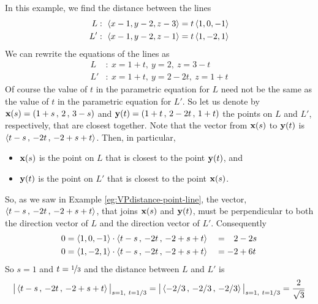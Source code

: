 \begin{eg}[Optional]\label{eg:VPdistance-line-line}
In this example, we find the distance between the lines
\begin{align*}
L&:\  \left< x-1,y-2,z-3\right> = t \left< 1,0,-1 \right> \\
L'&:\ \left< x-1,y-2,z-1\right> = t \left< 1,-2,1 \right> 
\end{align*}
We can rewrite the equations of the lines as
\begin{align*}
L&:\  x=1+t,\ y=2,\ z=3-t \\
L'&:\ x=1+t,\ y=2-2t,\ z=1+t 
\end{align*}
Of course the value of $t$ in the parametric equation for $L$ need not be 
the same as the value of $t$ in the parametric equation for $L'$. So 
let us denote by $\mathbf{x}(s) = (1+s\,,\,2\,,\,3-s)$ and 
$\mathbf{y}(t) = (1+t\,,\,2-2t\,,\,1+t)$ 
the points on $L$ and $L'$, respectively, that are closest together. 
Note that the vector from $\mathbf{x}(s)$ to $\mathbf{y}(t)$ is
$\left<  t-s\,,\,-2t\,,\,-2+s+t \right>$. Then, in particular,
\begin{itemize}\itemsep1pt \parskip0pt 
\item
$\mathbf{x}(s)$ is the point on $L$ that is closest to the point $\mathbf{y}(t)$, and
\item
$\mathbf{y}(t)$ is the point on $L'$ that is closest to the point $\mathbf{x}(s)$.
\end{itemize}
So, as we saw in Example \ref{eg:VPdistance-point-line},
the vector, $\left<  t-s\,,\,-2t\,,\,-2+s+t \right>$, that joins $\mathbf{x}(s)$ and $\mathbf{y}(t)$, must be perpendicular to both the direction vector of $L$ and the
direction vector of $L'$. Consequently
\begin{alignat*}{3}
0&= \left< 1,0,-1\right>\cdot\left<  t-s\,,\,-2t\,,\,-2+s+t \right>
 &&= \phantom{-}2-2s
\\
0&= \left< 1,-2,1\right>\cdot\left<  t-s\,,\,-2t\,,\,-2+s+t \right>
 &&=-2+6t
\end{alignat*}
So $s=1$ and $t=\nicefrac{1}{3}$ and the distance between $L$ and $L'$ is
\begin{align*}
\big|\left<  t-s\,,\,-2t\,,\,-2+s+t \right>\big|_{s=1,\ t=1/3}
=\big|\left< -2/3\,,\,-2/3\,,\,-2/3 \right>\big|_{s=1,\ t=1/3}
=\frac{2}{\sqrt{3}}
\end{align*}

\end{eg}


